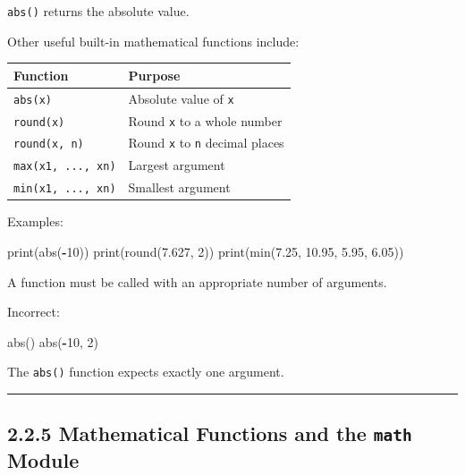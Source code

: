 \documentclass[
]{article}
\newenvironment{Shaded}{\begin{snugshade}}{\end{snugshade}}
\newcommand{\BuiltInTok}[1]{#1}
\newcommand{\DecValTok}[1]{\textcolor[rgb]{0.00,0.00,0.81}{#1}}
\newcommand{\FloatTok}[1]{\textcolor[rgb]{0.00,0.00,0.81}{#1}}
\newcommand{\NormalTok}[1]{#1}
\newcommand{\OperatorTok}[1]{\textcolor[rgb]{0.81,0.36,0.00}{\textbf{#1}}}
\newcounter{none} %
\begin{document}
\texttt{abs()} returns the absolute value.

Other useful built-in mathematical functions include:

{\def\LTcaptype{none} %
\begin{longtable}[]{@{}ll@{}}
\toprule\noalign{}
Function & Purpose \\
\midrule\noalign{}
\endhead
\bottomrule\noalign{}
\endlastfoot
\texttt{abs(x)} & Absolute value of \texttt{x} \\
\texttt{round(x)} & Round \texttt{x} to a whole number \\
\texttt{round(x,\ n)} & Round \texttt{x} to \texttt{n} decimal places \\
\texttt{max(x1,\ ...,\ xn)} & Largest argument \\
\texttt{min(x1,\ ...,\ xn)} & Smallest argument \\
\end{longtable}
}

Examples:

\begin{Shaded}
\begin{Highlighting}[]
\BuiltInTok{print}\NormalTok{(}\BuiltInTok{abs}\NormalTok{(}\OperatorTok{{-}}\DecValTok{10}\NormalTok{))}
\BuiltInTok{print}\NormalTok{(}\BuiltInTok{round}\NormalTok{(}\FloatTok{7.627}\NormalTok{, }\DecValTok{2}\NormalTok{))}
\BuiltInTok{print}\NormalTok{(}\BuiltInTok{min}\NormalTok{(}\FloatTok{7.25}\NormalTok{, }\FloatTok{10.95}\NormalTok{, }\FloatTok{5.95}\NormalTok{, }\FloatTok{6.05}\NormalTok{))}
\end{Highlighting}
\end{Shaded}

A function must be called with an appropriate number of arguments.

Incorrect:

\begin{Shaded}
\begin{Highlighting}[]
\BuiltInTok{abs}\NormalTok{()}
\BuiltInTok{abs}\NormalTok{(}\OperatorTok{{-}}\DecValTok{10}\NormalTok{, }\DecValTok{2}\NormalTok{)}
\end{Highlighting}
\end{Shaded}

The \texttt{abs()} function expects exactly one argument.

\begin{center}\rule{0.5\linewidth}{0.5pt}\end{center}

\subsection{\texorpdfstring{2.2.5 Mathematical Functions and the
\texttt{math}
Module}{2.2.5 Mathematical Functions and the math Module}}\label{mathematical-functions-and-the-math-module}
\end{document}
